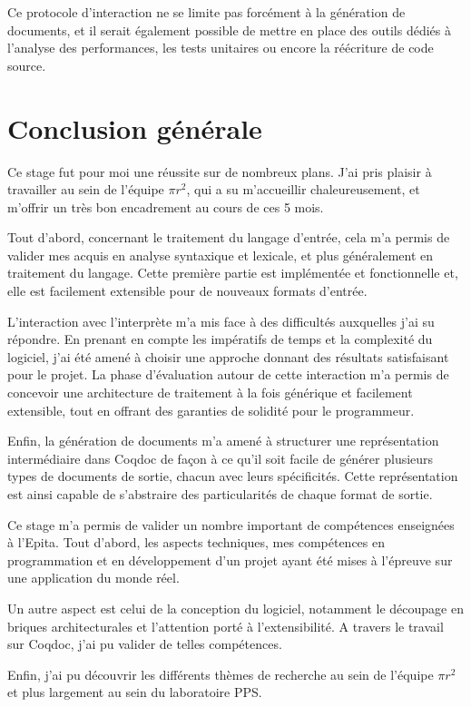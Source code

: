\documentclass[a4paper, 11pt]{report}
\newcommand{\pir}[0]{\textbf{$\pi r^2$}\xspace}
\begin{document}
    Ce protocole d'interaction ne se limite pas forcément à la génération de
    documents, et il serait également possible de mettre en place des outils
    dédiés à l'analyse des performances, les tests unitaires ou encore la
    réécriture de code source.

\chapter{Conclusion générale}
Ce stage fut pour moi une réussite sur de nombreux plans. J'ai pris plaisir
à travailler au sein de l'équipe \pir, qui a su m'accueillir chaleureusement, et
m'offrir un très bon encadrement au cours de ces 5 mois.

Tout d'abord, concernant le traitement du langage d'entrée, cela m'a permis
de valider mes acquis en analyse syntaxique et lexicale, et plus généralement
en traitement du langage. Cette première partie est implémentée et fonctionnelle
et, elle est facilement extensible pour de nouveaux formats d'entrée.

L'interaction avec l'interprète m'a mis face à des difficultés auxquelles j'ai
su répondre. En prenant en compte les impératifs de temps et la complexité du
logiciel, j'ai été amené à choisir une approche donnant des résultats
satisfaisant pour le projet. La phase d'évaluation autour de cette interaction
m'a permis de concevoir une architecture de traitement à la fois générique et
facilement extensible, tout en offrant des garanties de solidité pour le
programmeur.

Enfin, la génération de documents m'a amené à structurer une représentation
intermédiaire dans Coqdoc de façon à ce qu'il soit facile de générer plusieurs
types de documents de sortie, chacun avec leurs spécificités. Cette représentation
est ainsi capable de s'abstraire des particularités de chaque format de sortie.

Ce stage m'a permis de valider un nombre important de compétences enseignées
à l'Epita. Tout d'abord, les aspects techniques, mes compétences en
programmation et en développement d'un projet ayant été mises à l'épreuve sur
une application du monde réel.

Un autre aspect est celui de la conception du logiciel, notamment le découpage
en briques architecturales et l'attention porté à l'extensibilité. A travers
le travail sur Coqdoc, j'ai pu valider de telles compétences.

Enfin, j'ai pu découvrir les différents thèmes de recherche au sein de l'équipe
\pir et plus largement au sein du laboratoire PPS.


\end{document}
